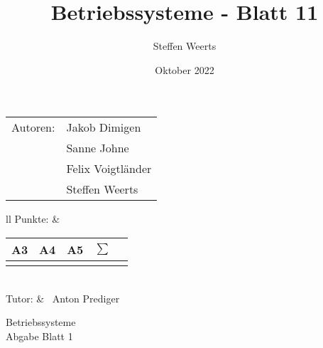 \documentclass[12pt,a4paper,oneside,ngerman]{article}
\title{Betriebssysteme - Blatt 11}
\author{Steffen Weerts}
\date{Oktober 2022}
\newcommand{\fach}{Betriebssysteme}
\newcommand{\dokumentenTitel}{Abgabe Blatt 1}
\newcommand{\tutor}{Anton Prediger}
\newcommand{\memberOne}{Jakob Dimigen}
\newcommand{\memberTwo}{Sanne Johne}
\newcommand{\memberThree}{Felix Voigtl\"ander}
\newcommand{\memberFour}{Steffen Weerts}
\begin{document}
\thispagestyle{plain}

\begin{multicols}{2} %
		\hspace{-1cm} %
		\begin{tabular}{ll} %
			Autoren: & \memberOne \\ %
			& \memberTwo \\
			& \memberThree  \\
			& \memberFour \\ %
			 
		\end{tabular}
		
		\columnbreak %
		\hspace{-1cm} %
		\raggedleft \begin{tabular}{ll} %
			Punkte: &  
			\renewcommand{\arraystretch}{1.2} 
			\begin{tabular}{|p{0.8cm}|p{0.8cm}|p{0.8cm}|p{0.8cm}|p{0.8cm}|}
				\hline A3 & A4 & A5 & $\sum\limits^{ }$ \\ \hline
				& & & \\ \hline    
			\end{tabular} \\ Tutor: &  \ \tutor \\
		\end{tabular}
		
	\end{multicols} %
	
	\begin{center}
		\Large{\fach} \\
		\LARGE{\dokumentenTitel} \\
    \end{center}
\end{document}
